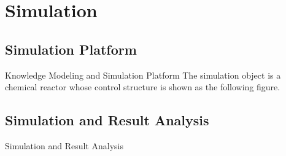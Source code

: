 \section{Simulation}
\subsection{Simulation Platform}
\begin{frame}{Knowledge Modeling and Simulation Platform}
    The simulation object is a chemical reactor whose control structure is shown as the following figure.
    \begin{center}
      
    \end{center}
\end{frame}

\subsection{Simulation and Result Analysis}
\begin{frame}{Simulation and Result Analysis}
\end{frame} 
